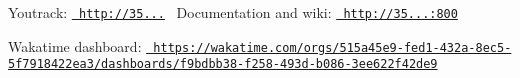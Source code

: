 Youtrack\+: \href{http://35.195.118.149}{\texttt{ http\+://35...}}~\newline
 Documentation and wiki\+: \href{http://35.195.118.149:800}{\texttt{ http\+://35...\+:800}}

Wakatime dashboard\+: \href{https://wakatime.com/orgs/515a45e9-fed1-432a-8ec5-5f7918422ea3/dashboards/f9bdbb38-f258-493d-b086-3ee622f42de9}{\texttt{ https\+://wakatime.\+com/orgs/515a45e9-\/fed1-\/432a-\/8ec5-\/5f7918422ea3/dashboards/f9bdbb38-\/f258-\/493d-\/b086-\/3ee622f42de9}} 